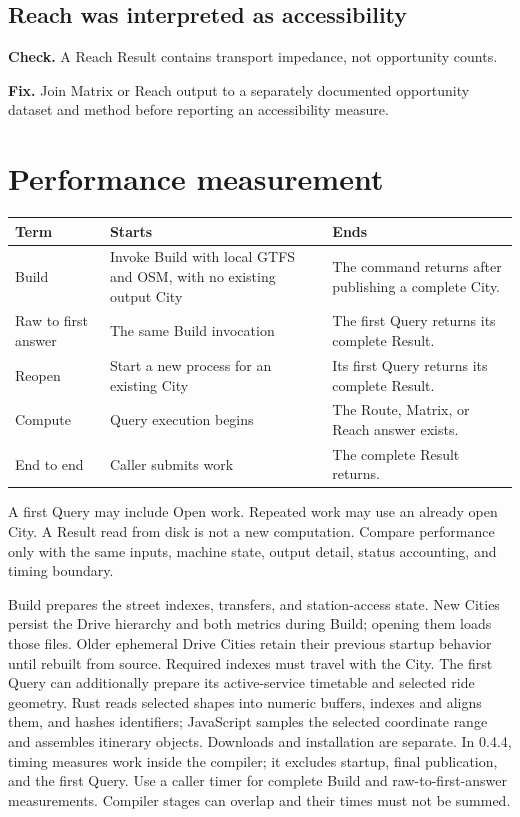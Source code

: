 \documentclass[10pt,letterpaper]{article}
\begin{document}
\subsection{Reach was interpreted as accessibility}

\textbf{Check.} A Reach Result contains transport impedance, not opportunity counts.

\textbf{Fix.} Join Matrix or Reach output to a separately documented opportunity dataset and method before reporting an accessibility measure.

\clearpage
\appendix

\section{Performance measurement}

\begin{center}
\begin{tabularx}{\linewidth}{P{1.05in} Y Y}
\toprule
\textbf{Term} & \textbf{Starts} & \textbf{Ends} \\
\midrule
Build & Invoke Build with local GTFS and OSM, with no existing output City & The command returns after publishing a complete City. \\
Raw to first answer & The same Build invocation & The first Query returns its complete Result. \\
Reopen & Start a new process for an existing City & Its first Query returns its complete Result. \\
Compute & Query execution begins & The Route, Matrix, or Reach answer exists. \\
End to end & Caller submits work & The complete Result returns. \\
\bottomrule
\end{tabularx}
\end{center}

A first Query may include Open work. Repeated work may use an already open City. A Result read from disk is not a new computation. Compare performance only with the same inputs, machine state, output detail, status accounting, and timing boundary.

Build prepares the street indexes, transfers, and station-access state. New Cities persist the Drive hierarchy and both metrics during Build; opening them loads those files. Older ephemeral Drive Cities retain their previous startup behavior until rebuilt from source. Required indexes must travel with the City. The first Query can additionally prepare its active-service timetable and selected ride geometry. Rust reads selected shapes into numeric buffers, indexes and aligns them, and hashes identifiers; JavaScript samples the selected coordinate range and assembles itinerary objects. Downloads and installation are separate. In 0.4.4,  timing  measures work inside the compiler; it excludes startup, final publication, and the first Query. Use a caller timer for complete Build and raw-to-first-answer measurements. Compiler stages can overlap and their times must not be summed.
\end{document}
